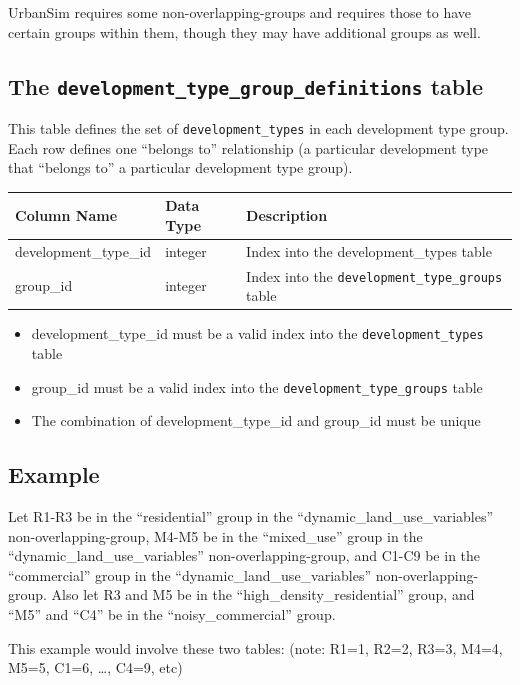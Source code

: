 UrbanSim requires some non-overlapping-groups and requires those to have
certain groups within them, though they may have additional groups as well.

\subsection{The {\tt development_type_group_definitions} table}

This table defines the set of \verb|development_types| in each
development type group. Each row defines one ``belongs to'' relationship (a
particular development type that ``belongs to'' a particular
development type group).

\begin{tabular}{|l|l|l|}
\hline
\textbf{Column Name} & \textbf{Data Type} & \textbf{Description} \\

\hline
development_type_id & integer & Index into the development_types table  \\
\hline
group_id & integer & Index into the \verb|development_type_groups| table  \\
\hline

\end{tabular}

\begin{itemize}
\tight
\item development_type_id must be a valid index into the \verb|development_types| table
\item group_id must be a valid index into the \verb|development_type_groups| table
\item The combination of development_type_id and group_id must be unique

\end{itemize}

\subsection{Example}

Let R1-R3 be in the
``residential'' group in the ``dynamic_land_use_variables''
non-overlapping-group, M4-M5 be in the ``mixed_use'' group in the
``dynamic_land_use_variables'' non-overlapping-group, and C1-C9 be in the
``commercial'' group in the ``dynamic_land_use_variables''
non-overlapping-group. Also let R3 and M5 be in the
``high_density_residential'' group, and ``M5'' and ``C4'' be in the
``noisy_commercial'' group.

This example would involve these two tables: (note: R1=1, R2=2, R3=3,
M4=4, M5=5, C1=6, \ldots, C4=9, etc)

